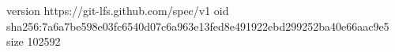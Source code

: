 version https://git-lfs.github.com/spec/v1
oid sha256:7a6a7be598e03fc6540d07c6a963e13fed8e491922ebd299252ba40e66aac9e5
size 102592
